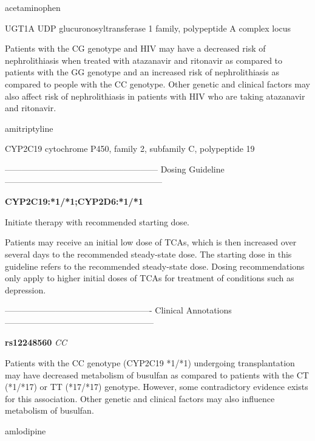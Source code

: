 \documentclass{resume} %
\begin{document}
\begin{rSection}{ acetaminophen }
\begin{rSubsection}{ UGT1A }{ UDP glucuronosyltransferase 1 family, polypeptide A complex locus }{}{}
\item[] Patients with the CG genotype and HIV may have a decreased risk of nephrolithiasis when treated with atazanavir and ritonavir as compared to patients with the GG genotype and an increased risk of nephrolithiasis as compared to people with the CC genotype. Other genetic and clinical factors may also affect risk of nephrolithiasis in patients with HIV who are taking atazanavir and ritonavir.
\end{rSubsection}

\end{rSection}\begin{rSection}{ amitriptyline }
\item[]

\begin{rSubsection}{ CYP2C19 }{ cytochrome P450, family 2, subfamily C, polypeptide 19 }{}{}
\item[]
\item[] ------------------------------------------------------ Dosing Guideline --------------------------------------------------------\newline
\item[] \textbf{ CYP2C19:*1/*1;CYP2D6:*1/*1 }

\item[] Initiate therapy with recommended starting dose.

Patients may receive an initial low dose of TCAs, which is then increased over several days to the recommended steady-state dose. The starting dose in this guideline refers to the recommended steady-state dose. Dosing recommendations only apply to higher initial doses of TCAs for treatment of conditions such as depression.
\item[] ---------------------------------------------------- Clinical Annotations -----------------------------------------------------\newline
\item \textbf{ rs12248560 } \textit{ CC }
\item[] Patients with the CC genotype (CYP2C19 *1/*1) undergoing transplantation may have decreased metabolism of busulfan as compared to patients with the CT (*1/*17) or TT (*17/*17) genotype. However, some contradictory evidence exists for this association. Other genetic and clinical factors may also influence metabolism of busulfan.
\end{rSubsection}

\end{rSection}\begin{rSection}{ amlodipine }
\item[]


\end{rSection}
\end{document}
